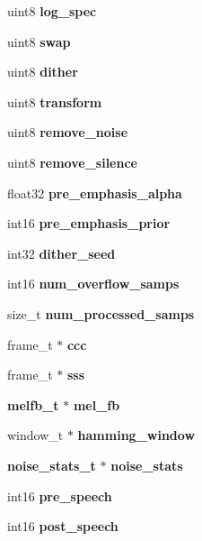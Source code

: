 \begin{DoxyCompactItemize}
uint8 {\bfseries log\+\_\+spec}
\item 
\mbox{\label{structfe__s_ab08200d2bfc6d868536d802501525179}} 
uint8 {\bfseries swap}
\item 
\mbox{\label{structfe__s_abd7b32a70dc6512134e39dd54d160689}} 
uint8 {\bfseries dither}
\item 
\mbox{\label{structfe__s_a49f2e495d938acaf5c918059e99854e2}} 
uint8 {\bfseries transform}
\item 
\mbox{\label{structfe__s_a254fc94d7868163fba6f2d8826d60fa6}} 
uint8 {\bfseries remove\+\_\+noise}
\item 
\mbox{\label{structfe__s_a8479b916c411d6d0140bf4a16eb83437}} 
uint8 {\bfseries remove\+\_\+silence}
\item 
\mbox{\label{structfe__s_aa7dc496e33955b7f06f83715c05ded8e}} 
float32 {\bfseries pre\+\_\+emphasis\+\_\+alpha}
\item 
\mbox{\label{structfe__s_a063765dd6e387065d2dad2cdf514320e}} 
int16 {\bfseries pre\+\_\+emphasis\+\_\+prior}
\item 
\mbox{\label{structfe__s_aa0b7171d2268fd38c7ba01c75dd587ff}} 
int32 {\bfseries dither\+\_\+seed}
\item 
\mbox{\label{structfe__s_ac22fe7c117ef00eb513d7d0771333ddd}} 
int16 {\bfseries num\+\_\+overflow\+\_\+samps}
\item 
\mbox{\label{structfe__s_a07994a957d8cc150a4187306b8dcb3b7}} 
size\+\_\+t {\bfseries num\+\_\+processed\+\_\+samps}
\item 
\mbox{\label{structfe__s_afc472de43bd747de659dd57bc9a74fae}} 
frame\+\_\+t $\ast$ {\bfseries ccc}
\item 
\mbox{\label{structfe__s_a6525c59397073d363e1844c28746fcb9}} 
frame\+\_\+t $\ast$ {\bfseries sss}
\item 
\mbox{\label{structfe__s_ae5a054dbac5e32cf028b6d6d4c9391bd}} 
\textbf{ melfb\+\_\+t} $\ast$ {\bfseries mel\+\_\+fb}
\item 
\mbox{\label{structfe__s_ad47433337a370e452070ffddce87e474}} 
window\+\_\+t $\ast$ {\bfseries hamming\+\_\+window}
\item 
\mbox{\label{structfe__s_a6b1303b8c74a676ca9dcc9adc07033e9}} 
\textbf{ noise\+\_\+stats\+\_\+t} $\ast$ {\bfseries noise\+\_\+stats}
\item 
\mbox{\label{structfe__s_a2bcaff6bbc8ee6e990a7092bd0d22771}} 
int16 {\bfseries pre\+\_\+speech}
\item 
\mbox{\label{structfe__s_a46c8eab758b1a737ccc5ef4654e42f6c}} 
int16 {\bfseries post\+\_\+speech}
\item 

\end{DoxyCompactItemize}
